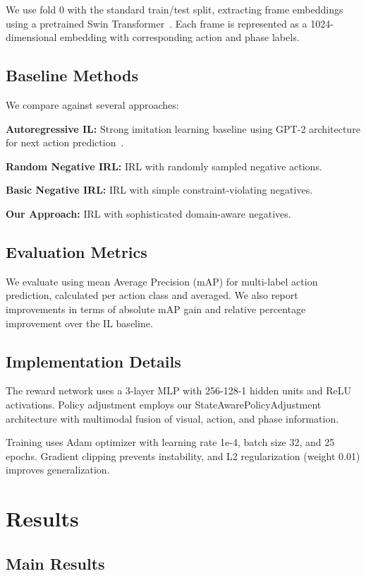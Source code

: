 \documentclass[runningheads]{llncs}
\begin{document}
We use fold 0 with the standard train/test split, extracting frame embeddings using a pretrained Swin Transformer~\cite{liu2021swin}. Each frame is represented as a 1024-dimensional embedding with corresponding action and phase labels.

\subsection{Baseline Methods}
We compare against several approaches:

\textbf{Autoregressive IL:} Strong imitation learning baseline using GPT-2 architecture for next action prediction~\cite{author2023autoregressive}.

\textbf{Random Negative IRL:} IRL with randomly sampled negative actions.

\textbf{Basic Negative IRL:} IRL with simple constraint-violating negatives.

\textbf{Our Approach:} IRL with sophisticated domain-aware negatives.

\subsection{Evaluation Metrics}
We evaluate using mean Average Precision (mAP) for multi-label action prediction, calculated per action class and averaged. We also report improvements in terms of absolute mAP gain and relative percentage improvement over the IL baseline.

\subsection{Implementation Details}
The reward network uses a 3-layer MLP with 256-128-1 hidden units and ReLU activations. Policy adjustment employs our StateAwarePolicyAdjustment architecture with multimodal fusion of visual, action, and phase information.

Training uses Adam optimizer with learning rate 1e-4, batch size 32, and 25 epochs. Gradient clipping prevents instability, and L2 regularization (weight 0.01) improves generalization.

\section{Results}

\subsection{Main Results}
\end{document}
